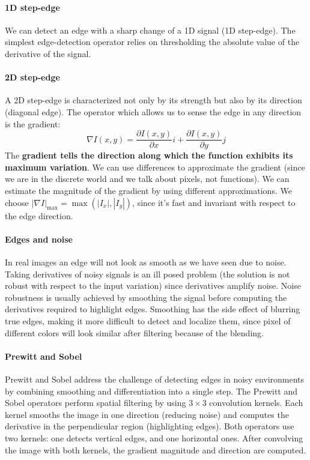 \paragraph{1D step-edge}
We can detect an edge with a sharp change of a 1D signal (1D step-edge).
The simplest edge-detection operator relies on thresholding the absolute value of the derivative of the signal.

\paragraph{2D step-edge}
A 2D step-edge is characterized not only by its strength but also by its direction (diagonal edge).
The operator which allows us to sense the edge in any direction is the gradient:
$$\nabla I(x,y) = \frac{\partial I(x,y)}{\partial x}i + \frac{\partial I(x,y)}{\partial y}j$$
The \textbf{gradient tells the direction along which the function exhibits its maximum variation}.
We can use differences to approximate the gradient (since we are in the discrete world and we talk about pixels, not functions).
We can estimate the magnitude of the gradient by using different approximations.
We choose $|\nabla I|_{\max}=\max(|I_x|, |I_y|)$, since it's fast and invariant with respect to the edge direction.

\paragraph{Edges and noise}
In real images an edge will not look as smooth as we have seen due to noise.
Taking derivatives of noisy signals is an ill posed problem (the solution is not robust with respect to the input variation) since derivatives amplify noise.
Noise robustness is usually achieved by smoothing the signal before computing the derivatives required to highlight edges.
Smoothing has the side effect of blurring true edges, making it more difficult to detect and localize them, since pixel of different colors will look similar after filtering because of the blending.

\paragraph{Prewitt and Sobel}
Prewitt and Sobel address the challenge of detecting edges in noisy environments by combining smoothing and differentiation into a single step.
The Prewitt and Sobel operators perform spatial filtering by using $3 \times 3$ convolution kernels.
Each kernel smooths the image in one direction (reducing noise) and computes the derivative in the perpendicular region (highlighting edges).
Both operators use two kernels: one detects vertical edges, and one horizontal ones.
After convolving the image with both kernels, the gradient magnitude and direction are computed.

